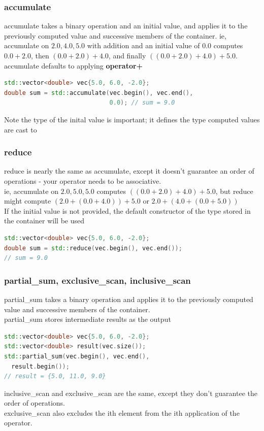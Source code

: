 \documentclass{beamer}
\begin{document}
\begin{frame}[fragile]
  \frametitle{accumulate}
  accumulate takes a binary operation and an initial value,
  and applies it to the previously computed value and successive members of the container.
  ie, accumulate on ${2.0, 4.0, 5.0}$ with addition and an initial value of $0.0$ computes
  $0.0 + 2.0$, then $(0.0 + 2.0) + 4.0$, and finally $((0.0 + 2.0) + 4.0) + 5.0$.\\
  accumulate defaults to applying {\bf operator+}\\
  \begin{lstlisting}[language=C++]
std::vector<double> vec{5.0, 6.0, -2.0};
double sum = std::accumulate(vec.begin(), vec.end(),
                             0.0); // sum = 9.0
  \end{lstlisting}
Note the type of the inital value is important; it defines the type computed values are cast to
\end{frame}

\begin{frame}[fragile]
  \frametitle{reduce}
  reduce is nearly the same as accumulate, except it doesn't guarantee an order of operations
  - your operator needs to be associative.\\
  ie, accumulate on ${2.0, 5.0, 5.0}$ computes $((0.0 + 2.0) + 4.0) + 5.0$,
  but reduce might compute $(2.0 + (0.0 + 4.0)) + 5.0$ or $2.0 + (4.0 + (0.0 + 5.0))$\\
  If the initial value is not provided, the default constructor of the type stored in the container will be used
  \begin{lstlisting}[language=C++]
std::vector<double> vec{5.0, 6.0, -2.0};
double sum = std::reduce(vec.begin(), vec.end());
// sum = 9.0
  \end{lstlisting}
\end{frame}

\begin{frame}[fragile]
  \frametitle{partial\_sum, exclusive\_scan, inclusive\_scan}
  partial\_sum takes a binary operation and applies it to the
  previously computed value and successive members of the container.\\
  partial\_sum stores intermediate results as the output\\

  \begin{lstlisting}[language=C++]
std::vector<double> vec{5.0, 6.0, -2.0};
std::vector<double> result(vec.size());
std::partial_sum(vec.begin(), vec.end(),
  result.begin());
// result = {5.0, 11.0, 9.0}
  \end{lstlisting}
  inclusive\_scan and exclusive\_scan are the same, except they don't guarantee the order of operations.\\
  exclusive\_scan also excludes the ith element from the ith application of the operator.
\end{frame}
\end{document}

